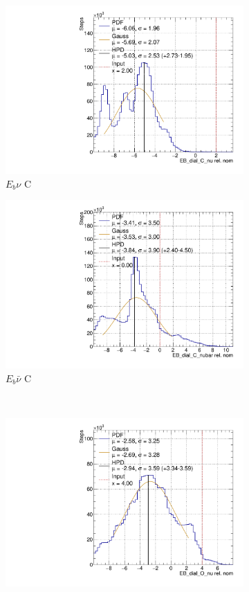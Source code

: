 \begin{figure}[!htbp]
\centering
\begin{subfigure}{.48\textwidth}
  \centering
  \includegraphics[width=0.73\linewidth]{figs/EB_dial_C_nuDataPoly}
  \caption{$E_{b}\nu$ C}
\end{subfigure}
\begin{subfigure}{.48\textwidth}
  \centering
  \includegraphics[width=0.73\linewidth]{figs/EB_dial_C_nubarDataPoly}
  \caption{$E_{b}\bar{\nu}$ C}
\end{subfigure} \\
\begin{subfigure}{.48\textwidth}
  \centering
  \includegraphics[width=0.73\linewidth]{figs/EB_dial_O_nuDataPoly}

\end{subfigure}
\end{figure}
